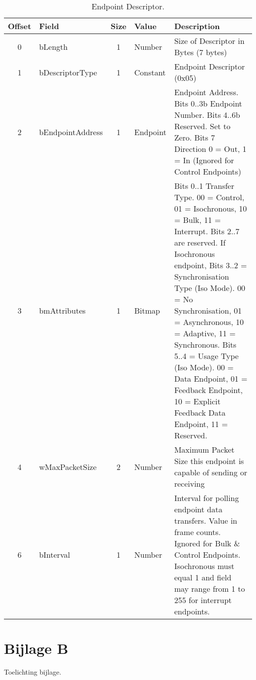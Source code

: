 \begin{appendices}
\begin{table}[h]
\centering
\label{tab:usb_endpoint_descriptor}
\begin{tabular}{|c|l|c|l|p{8cm}|}
\hline
\textbf{Offset} & \textbf{Field} & \textbf{Size} & \textbf{Value} & \textbf{Description} \\ \hline
0 & bLength & 1 & Number & Size of Descriptor in Bytes (7 bytes) \\ \hline
1 & bDescriptorType & 1 & Constant & Endpoint Descriptor (0x05) \\ \hline
2 & bEndpointAddress & 1 & Endpoint & Endpoint Address. Bits 0..3b Endpoint Number. Bits 4..6b Reserved. Set to Zero. Bits 7 Direction 0 = Out, 1 = In (Ignored for Control Endpoints) \\ \hline
3 & bmAttributes & 1 & Bitmap & Bits 0..1 Transfer Type. 00 = Control, 01 = Isochronous, 10 = Bulk, 11 = Interrupt. Bits 2..7 are reserved. If Isochronous endpoint, Bits 3..2 = Synchronisation Type (Iso Mode). 00 = No Synchronisation, 01 = Asynchronous, 10 = Adaptive, 11 = Synchronous. Bits 5..4 = Usage Type (Iso Mode). 00 = Data Endpoint, 01 = Feedback Endpoint, 10 = Explicit Feedback Data Endpoint, 11 = Reserved. \\ \hline
4 & wMaxPacketSize & 2 & Number & Maximum Packet Size this endpoint is capable of sending or receiving \\ \hline
6 & bInterval & 1 & Number & Interval for polling endpoint data transfers. Value in frame counts. Ignored for Bulk \& Control Endpoints. Isochronous must equal 1 and field may range from 1 to 255 for interrupt endpoints. \\ \hline
\end{tabular}
\caption{Endpoint Descriptor.}
\end{table}



\newpage
\section*{Bijlage B}

Toelichting bijlage.

\end{appendices}
